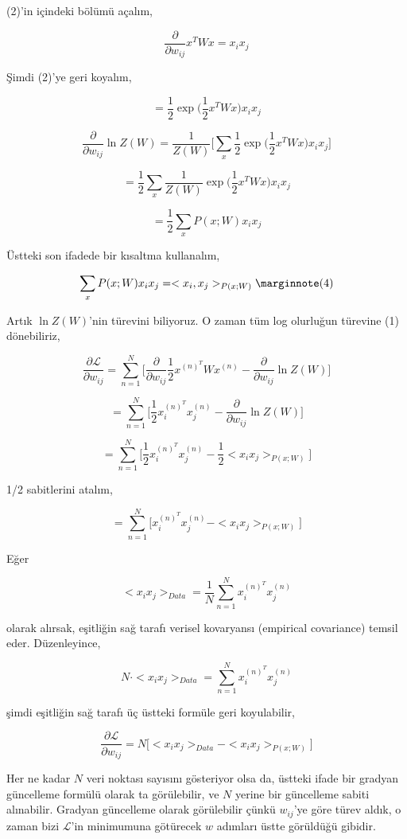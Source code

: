 \documentclass[12pt,fleqn]{article}\usepackage{../../common}
\begin{document}
(2)'in içindeki bölümü açalım,

$$ 
\frac{\partial}{\partial w_{ij}}x^T W x = x_i x_j 
$$

Şimdi (2)'ye geri koyalım,

$$ 
= \frac{1}{2} \exp \big( \frac{1}{2} x^T W x \big) x_i x_j
$$

$$ 
\frac{\partial}{\partial w_{ij}} \ln Z(W) = 
\frac{1}{Z(W)}
\bigg[ 
\sum_x \frac{1}{2}  \exp \big( \frac{1}{2} x^T W x \big) x_i x_j
\bigg]
$$

$$ 
= \frac{1}{2} \sum_x 
\frac{1}{Z(W)} \exp \big( \frac{1}{2} x^T W x \big) x_i x_j 
$$

$$ 
= \frac{1}{2}  \sum_x P(x;W) x_i x_j
$$

Üstteki son ifadede bir kısaltma kullanalım,

$$ 
\sum_x P(x;W) x_i x_j =  < x_i,x_j >_{P(x;W)}
\mlabel{4}
$$

Artık $\ln Z(W)$'nin türevini biliyoruz. O zaman tüm log olurluğun türevine
(1) dönebiliriz, 

$$  
\frac{\partial \mathcal{L}}{\partial w_{ij}} = 
\sum_{n=1}^{N} \bigg[ 
\frac{\partial}{\partial w_{ij}}  \frac{1}{2} x^{(n)^T} W x^{(n)} - 
\frac{\partial}{\partial w_{ij}}  \ln Z(W) \bigg]
$$

$$  
= \sum_{n=1}^{N} 
\bigg[ 
\frac{1}{2} x_i^{(n)^T}x_j^{(n)} - 
\frac{\partial}{\partial w_{ij}}  \ln Z(W) 
\bigg]
$$

$$  
= \sum_{n=1}^{N} 
\bigg[ 
\frac{1}{2} x_i^{(n)^T}x_j^{(n)} - 
\frac{1}{2}< x_i x_j >_{P(x;W)}
\bigg]
$$ 

1/2 sabitlerini atalım, 

$$  
= \sum_{n=1}^{N} 
\bigg[ 
 x_i^{(n)^T}x_j^{(n)} - < x_i x_j >_{P(x;W)}
\bigg]
$$

Eğer 

$$
< x_i x_j >_{Data} = \frac{1}{N} \sum_{n=1}^{N}  x_i^{(n)^T}x_j^{(n)}
$$

olarak alırsak, eşitliğin sağ tarafı verisel kovaryansı (empirical
covariance) temsil eder. Düzenleyince,

$$ 
N \cdot < x_i x_j >_{Data} = \sum_{n=1}^{N}  x_i^{(n)^T}x_j^{(n)}
$$

şimdi eşitliğin sağ tarafı üç üstteki formüle geri koyulabilir,

$$ 
\frac{\partial \mathcal{L}}{\partial w_{ij}}  = 
N \big[ < x_i x_j >_{Data}  - < x_ix_j >_{P(x;W)} \big] 
$$

Her ne kadar $N$ veri noktası sayısını gösteriyor olsa da, üstteki ifade
bir gradyan güncelleme formülü olarak ta görülebilir, ve $N$ yerine bir
güncelleme sabiti alınabilir. Gradyan güncelleme olarak görülebilir çünkü
$w_{ij}$'ye göre türev aldık, o zaman bizi $\mathcal{L}$'in minimumuna götürecek
$w$ adımları üstte görüldüğü gibidir. 
\end{document}
